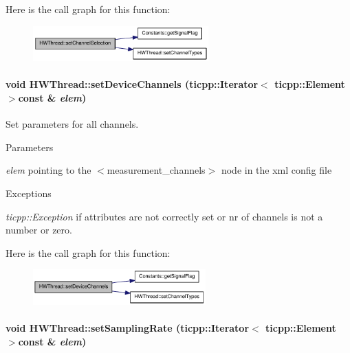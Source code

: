 Here is the call graph for this function:\nopagebreak
\begin{figure}[H]
\begin{center}
\leavevmode
\includegraphics[width=191pt]{class_h_w_thread_a6ed2a51d2a3a7b9313d1c33f5f507c57_cgraph}
\end{center}
\end{figure}
\hypertarget{class_h_w_thread_a379eecae202ad9b740e08ac22b5d7a42}{
\paragraph[{setDeviceChannels}]{\setlength{\rightskip}{0pt plus 5cm}void HWThread::setDeviceChannels (ticpp::Iterator$<$ ticpp::Element $>$const \& {\em elem})}\hfill}
\label{class_h_w_thread_a379eecae202ad9b740e08ac22b5d7a42}


Set parameters for all channels. 
\begin{DoxyParams}{Parameters}
\item[{\em elem}]pointing to the $<$measurement\_\-channels$>$ node in the xml config file \end{DoxyParams}

\begin{DoxyExceptions}{Exceptions}
\item[{\em ticpp::Exception}]if attributes are not correctly set or nr of channels is not a number or zero. \end{DoxyExceptions}


Here is the call graph for this function:\nopagebreak
\begin{figure}[H]
\begin{center}
\leavevmode
\includegraphics[width=188pt]{class_h_w_thread_a379eecae202ad9b740e08ac22b5d7a42_cgraph}
\end{center}
\end{figure}
\hypertarget{class_h_w_thread_a1bd5e440e5f86d0d9af928577c52b262}{
\paragraph[{setSamplingRate}]{\setlength{\rightskip}{0pt plus 5cm}void HWThread::setSamplingRate (ticpp::Iterator$<$ ticpp::Element $>$const \& {\em elem})}\hfill}
\label{class_h_w_thread_a1bd5e440e5f86d0d9af928577c52b262}


